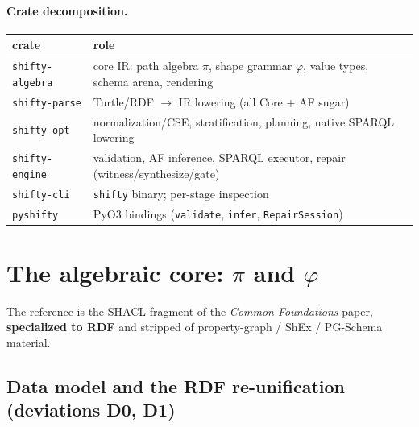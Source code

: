 \documentclass[11pt]{article}
\newcommand{\code}[1]{\texttt{#1}}
\theoremstyle{definition}
\begin{document}
\paragraph{Crate decomposition.}
\begin{center}
\begin{tabular}{@{}ll@{}}
\toprule
crate & role \\
\midrule
\code{shifty-algebra} & core IR: path algebra $\pi$, shape grammar $\varphi$, value types, schema arena, rendering \\
\code{shifty-parse}   & Turtle/RDF $\rightarrow$ IR lowering (all Core + AF sugar) \\
\code{shifty-opt}     & normalization/CSE, stratification, planning, native SPARQL lowering \\
\code{shifty-engine}  & validation, AF inference, SPARQL executor, repair (witness/synthesize/gate) \\
\code{shifty-cli}     & \code{shifty} binary; per-stage inspection \\
\code{pyshifty}       & PyO3 bindings (\code{validate}, \code{infer}, \code{RepairSession}) \\
\bottomrule
\end{tabular}
\end{center}

\section{The algebraic core: $\pi$ and $\varphi$}\label{sec:core}

The reference is the SHACL fragment of the \emph{Common Foundations} paper,
\textbf{specialized to RDF} and stripped of property-graph / ShEx / PG-Schema
material.

\subsection{Data model and the RDF re-unification (deviations D0, D1)}
\end{document}
